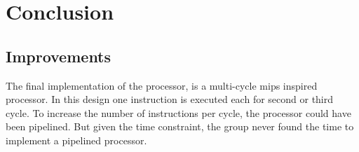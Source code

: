 \chapter{Conclusion}

\section{Improvements}
The final implementation of the processor, is a multi-cycle mips inspired processor.
In this design one instruction is executed each for second or third cycle.
To increase the number of instructions per cycle, the processor could have been pipelined.
But given the time constraint, the group never found the time to implement a pipelined processor.
